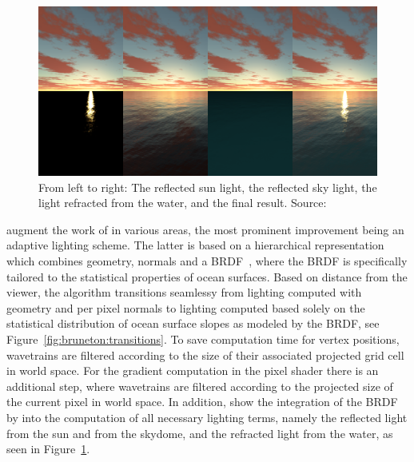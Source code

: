 %
%
\begin{figure}[p]
 \centering
 \includegraphics[scale=0.25]{figures/Seamless_Ocean_Lighting_-_Bruneton_2010-002.png}
 \caption[The separate lighting terms by \citet{article:oceanlighting}.]{
 From left to right: The reflected sun light, the reflected sky light,
 the light refracted from the water, and the final result.
 Source:~\citet{article:oceanlighting}}
\label{fig:bruneton:lightingterms}
\end{figure}
%
%

\citet{article:oceanlighting} augment the work of \citeauthor{Hinsinger:2002} in
various areas, the most prominent improvement being an adaptive lighting scheme.
The latter is based on a hierarchical representation which combines geometry,
normals and a BRDF~\citep{Ross:2005}, where the BRDF is specifically tailored to
the statistical properties of ocean surfaces. Based on distance from the viewer,
the algorithm transitions seamlessy from lighting computed with geometry and per
pixel normals to lighting computed based solely on the statistical distribution
of ocean surface slopes as modeled by the BRDF, see Figure~\ref{fig:bruneton:transitions}.
To save computation time for vertex positions, wavetrains are filtered according
to the size of their associated projected grid cell in world space.
For the gradient computation in the pixel shader there is an additional step,
where wavetrains are filtered according to the projected size of the current pixel
in world space. In addition, \citeauthor{article:oceanlighting} show the
integration of the BRDF by \citeauthor{Ross:2005} into the computation of
all necessary lighting terms, namely the reflected light from the sun and from
the skydome, and the refracted light from the water, as seen in
Figure~\ref{fig:bruneton:lightingterms}.
 
